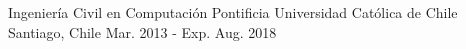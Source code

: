 

\begin{cventries}

  \cventry
    {Ingeniería Civil en Computación} %
    {Pontificia Universidad Católica de Chile} %
    {Santiago, Chile} %
    {Mar. 2013 - Exp. Aug. 2018} %
    {}

\end{cventries}
